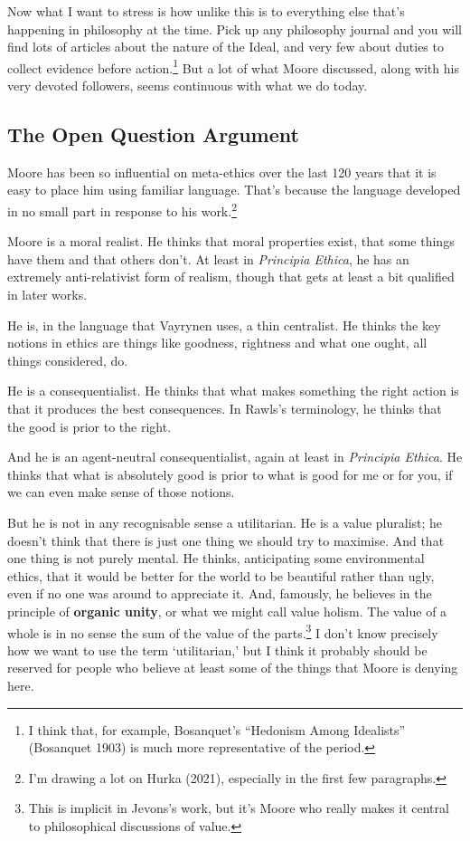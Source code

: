 \documentclass[
]{article}
\begin{document}
Now what I want to stress is how unlike this is to everything else
that's happening in philosophy at the time. Pick up any philosophy
journal and you will find lots of articles about the nature of the
Ideal, and very few about duties to collect evidence before
action.\footnote{I think that, for example, Bosanquet's ``Hedonism Among
  Idealists'' (Bosanquet 1903) is much more representative of the
  period.} But a lot of what Moore discussed, along with his very
devoted followers, seems continuous with what we do today.

\hypertarget{the-open-question-argument}{%
\subsection{The Open Question
Argument}\label{the-open-question-argument}}

Moore has been so influential on meta-ethics over the last 120 years
that it is easy to place him using familiar language. That's because the
language developed in no small part in response to his work.\footnote{I'm
  drawing a lot on Hurka (2021), especially in the first few paragraphs.}

Moore is a moral realist. He thinks that moral properties exist, that
some things have them and that others don't. At least in \emph{Principia
Ethica}, he has an extremely anti-relativist form of realism, though
that gets at least a bit qualified in later works.

He is, in the language that Vayrynen uses, a thin centralist. He thinks
the key notions in ethics are things like goodness, rightness and what
one ought, all things considered, do.

He is a consequentialist. He thinks that what makes something the right
action is that it produces the best consequences. In Rawls's
terminology, he thinks that the good is prior to the right.

And he is an agent-neutral consequentialist, again at least in
\emph{Principia Ethica}. He thinks that what is absolutely good is prior
to what is good for me or for you, if we can even make sense of those
notions.

But he is not in any recognisable sense a utilitarian. He is a value
pluralist; he doesn't think that there is just one thing we should try
to maximise. And that one thing is not purely mental. He thinks,
anticipating some environmental ethics, that it would be better for the
world to be beautiful rather than ugly, even if no one was around to
appreciate it. And, famously, he believes in the principle of
\textbf{organic unity}, or what we might call value holism. The value of
a whole is in no sense the sum of the value of the parts.\footnote{This
  is implicit in Jevons's work, but it's Moore who really makes it
  central to philosophical discussions of value.} I don't know precisely
how we want to use the term `utilitarian,' but I think it probably
should be reserved for people who believe at least some of the things
that Moore is denying here.
\end{document}
